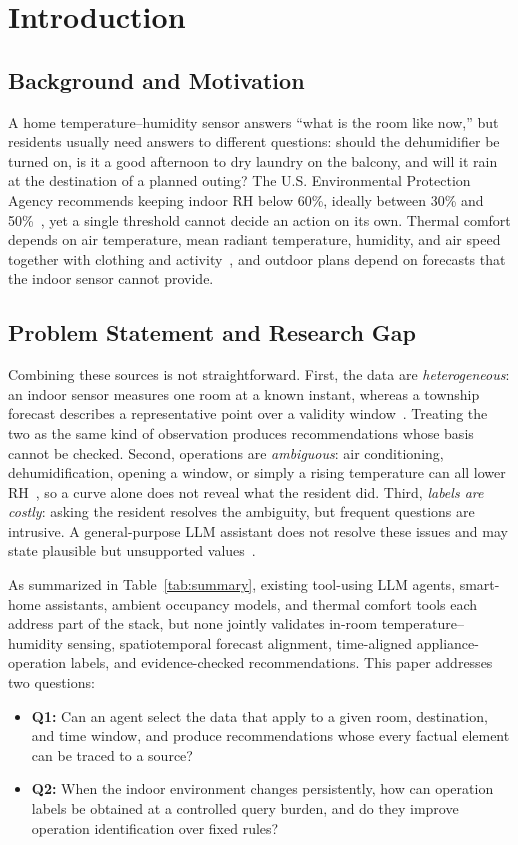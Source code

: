 \section{Introduction}\label{sec:intro}
\subsection{Background and Motivation}
A home temperature--humidity sensor answers ``what is the room like now,'' but residents usually need answers to different questions: should the dehumidifier be turned on, is it a good afternoon to dry laundry on the balcony, and will it rain at the destination of a planned outing? The U.S. Environmental Protection Agency recommends keeping indoor RH below 60\%, ideally between 30\% and 50\%~\cite{epa_mold}, yet a single threshold cannot decide an action on its own. Thermal comfort depends on air temperature, mean radiant temperature, humidity, and air speed together with clothing and activity~\cite{ashrae55,mishra2026myths}, and outdoor plans depend on forecasts that the indoor sensor cannot provide.

\subsection{Problem Statement and Research Gap}
Combining these sources is not straightforward. First, the data are \emph{heterogeneous}: an indoor sensor measures one room at a known instant, whereas a township forecast describes a representative point over a validity window~\cite{cwa_township}. Treating the two as the same kind of observation produces recommendations whose basis cannot be checked. Second, operations are \emph{ambiguous}: air conditioning, dehumidification, opening a window, or simply a rising temperature can all lower RH~\cite{nws_dewpoint}, so a curve alone does not reveal what the resident did. Third, \emph{labels are costly}: asking the resident resolves the ambiguity, but frequent questions are intrusive. A general-purpose LLM assistant does not resolve these issues and may state plausible but unsupported values~\cite{ji2023hallucination}.

As summarized in Table~\ref{tab:summary}, existing tool-using LLM agents, smart-home assistants, ambient occupancy models, and thermal comfort tools each address part of the stack, but none jointly validates in-room temperature--humidity sensing, spatiotemporal forecast alignment, time-aligned appliance-operation labels, and evidence-checked recommendations. This paper addresses two questions:
\begin{itemize}
\item \textbf{Q1:} Can an agent select the data that apply to a given room, destination, and time window, and produce recommendations whose every factual element can be traced to a source?
\item \textbf{Q2:} When the indoor environment changes persistently, how can operation labels be obtained at a controlled query burden, and do they improve operation identification over fixed rules?
\end{itemize}

